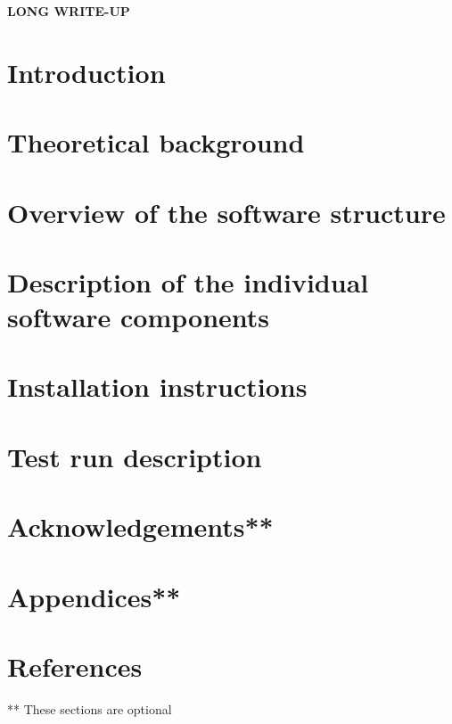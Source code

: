 \documentclass{elsart}
\begin{document}
\newpage


\hspace{1pc}
{\bf LONG WRITE-UP}

\section{Introduction}

\section{Theoretical background}

\section{Overview of the software structure}

\section{Description of the individual software components}

\section{Installation instructions}

\section{Test run description}

\section{Acknowledgements**}

\section{Appendices**}

\section{References}

** These sections are optional
\end{document}
